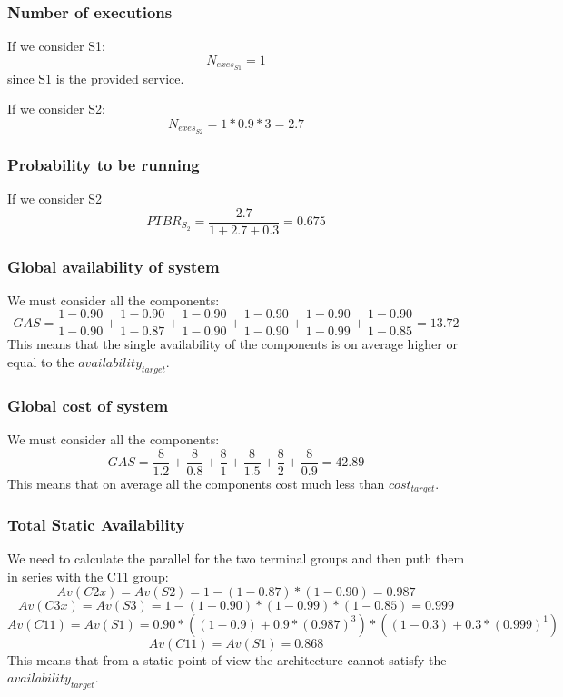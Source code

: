 \subsubsection{Number of executions}
If we consider S1:
\[N_{exes_{S1}} = 1\]
since S1 is the provided service.

\noindent If we consider S2:
\[N_{exes_{S2}} = 1 * 0.9 * 3 = 2.7\]
\subsubsection{Probability to be running}
If we consider S2
\[PTBR_{S_2} = \frac{2.7}{1 + 2.7 + 0.3} = 0.675\]
\subsubsection{Global availability of system}
We must consider all the components:
\[GAS = \frac{1-0.90}{1-0.90} + \frac{1-0.90}{1-0.87} + \frac{1-0.90}{1-0.90} + \frac{1-0.90}{1-0.90} + \frac{1-0.90}{1-0.99} + \frac{1-0.90}{1-0.85} = 13.72\]
This means that the single availability of the components is on average higher or equal to the \emph{$availability_{target}$}.
\subsubsection{Global cost of system}
We must consider all the components:
\[GAS = \frac{8}{1.2} + \frac{8}{0.8} + \frac{8}{1} + \frac{8}{1.5} + \frac{8}{2} + \frac{8}{0.9} = 42.89\]
This means that on average all the components cost much less than \emph{$cost_{target}$}.
\subsubsection{Total Static Availability}
We need to calculate the parallel for the two terminal groups and then puth them in series with the C11 group:
\[Av(C2x) = Av(S2) = 1-(1-0.87)*(1-0.90) = 0.987\]
\[Av(C3x) = Av(S3) = 1-(1-0.90)*(1-0.99)*(1-0.85) = 0.999\]
\[Av(C11) = Av(S1) = 0.90 * ((1-0.9)+0.9*(0.987)^3)*((1-0.3) + 0.3*(0.999)^1)\]
\[Av(C11) = Av(S1) = 0.868\]
This means that from a static point of view the architecture cannot satisfy the \emph{$availability_{target}$}.